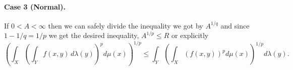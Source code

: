 \begin{enumerate}
\paragraph{Case 3 (Normal).}
If \(0 < A < \infty\) then we can safely divide the inequality
we got by \(A^{1/q}\) and since \(1-1/q=1/p\) we get the desired inequality,
\(A^{1/p} \leq R\) or explicitly
\begin{equation*}
 \left(\int_X 
    \left(\int_Y f(x,y)\,d\lambda(y)\right)^p d\mu(x)\right)^{1/p} 
\leq
 \int_Y\left(\int_X \left(f(x,y)\right)^pd\mu(x) \right)^{1/p} d\lambda(y).
\end{equation*}


\end{enumerate}
